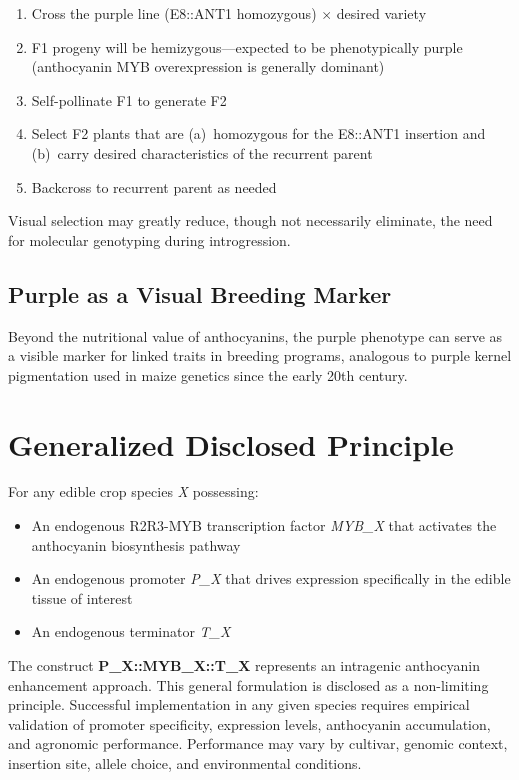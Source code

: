 \documentclass[12pt,a4paper]{article}
\begin{document}
\begin{enumerate}
  \item Cross the purple line (E8::ANT1 homozygous) $\times$ desired variety
  \item F1 progeny will be hemizygous---expected to be phenotypically purple (anthocyanin MYB overexpression is generally dominant)
  \item Self-pollinate F1 to generate F2
  \item Select F2 plants that are (a)~homozygous for the E8::ANT1 insertion and (b)~carry desired characteristics of the recurrent parent
  \item Backcross to recurrent parent as needed
\end{enumerate}

Visual selection may greatly reduce, though not necessarily eliminate, the need for molecular genotyping during introgression.

\subsection{Purple as a Visual Breeding Marker}

Beyond the nutritional value of anthocyanins, the purple phenotype can serve as a visible marker for linked traits in breeding programs, analogous to purple kernel pigmentation used in maize genetics since the early 20th century.

\section{Generalized Disclosed Principle}
\label{sec:generalized}

For any edible crop species \textit{X} possessing:
\begin{itemize}
  \item An endogenous R2R3-MYB transcription factor \textit{MYB\_X} that activates the anthocyanin biosynthesis pathway
  \item An endogenous promoter \textit{P\_X} that drives expression specifically in the edible tissue of interest
  \item An endogenous terminator \textit{T\_X}
\end{itemize}

The construct \textbf{P\_X::MYB\_X::T\_X} represents an intragenic anthocyanin enhancement approach. This general formulation is disclosed as a non-limiting principle. Successful implementation in any given species requires empirical validation of promoter specificity, expression levels, anthocyanin accumulation, and agronomic performance. Performance may vary by cultivar, genomic context, insertion site, allele choice, and environmental conditions.
\end{document}
